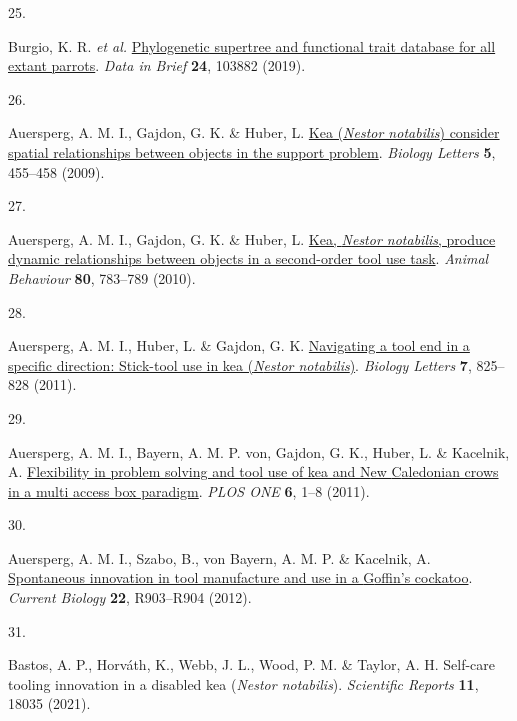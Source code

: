 \documentclass[
  man,floatsintext]{apa6}
\newlength{\cslhangindent}
\newlength{\csllabelwidth}
\newlength{\cslentryspacingunit} %
\newenvironment{CSLReferences}[2] %
 {%
  \setlength{\parindent}{0pt}
  \ifodd #1
  \let\oldpar\par
  \def\par{\hangindent=\cslhangindent\oldpar}
  \fi
  \setlength{\parskip}{#2\cslentryspacingunit}
 }%
 {}
\newcommand{\CSLLeftMargin}[1]{\parbox[t]{\csllabelwidth}{#1}}
\newcommand{\CSLRightInline}[1]{\parbox[t]{\linewidth - \csllabelwidth}{#1}\break}
\begin{document}
\begin{CSLReferences}{0}{0}
\leavevmode{}%
\CSLLeftMargin{25. }%
\CSLRightInline{Burgio, K. R. \emph{et al.} \href{https://doi.org/10.1016/j.dib.2019.103882}{Phylogenetic supertree and functional trait database for all extant parrots}. \emph{Data in Brief} \textbf{24}, 103882 (2019).}

\leavevmode{}%
\CSLLeftMargin{26. }%
\CSLRightInline{Auersperg, A. M. I., Gajdon, G. K. \& Huber, L. \href{https://doi.org/10.1098/rsbl.2009.0114}{Kea (\emph{{N}estor notabilis}) consider spatial relationships between objects in the support problem}. \emph{Biology Letters} \textbf{5}, 455--458 (2009).}

\leavevmode{}%
\CSLLeftMargin{27. }%
\CSLRightInline{Auersperg, A. M. I., Gajdon, G. K. \& Huber, L. \href{https://doi.org/10.1016/j.anbehav.2010.08.007}{Kea, \emph{{N}estor notabilis}, produce dynamic relationships between objects in a second-order tool use task}. \emph{Animal Behaviour} \textbf{80}, 783--789 (2010).}

\leavevmode{}%
\CSLLeftMargin{28. }%
\CSLRightInline{Auersperg, A. M. I., Huber, L. \& Gajdon, G. K. \href{https://doi.org/10.1098/rsbl.2011.0388}{Navigating a tool end in a specific direction: Stick-tool use in kea (\emph{{N}estor notabilis})}. \emph{Biology Letters} \textbf{7}, 825--828 (2011).}

\leavevmode{}%
\CSLLeftMargin{29. }%
\CSLRightInline{Auersperg, A. M. I., Bayern, A. M. P. von, Gajdon, G. K., Huber, L. \& Kacelnik, A. \href{https://doi.org/10.1371/journal.pone.0020231}{Flexibility in problem solving and tool use of kea and {N}ew {C}aledonian crows in a multi access box paradigm}. \emph{PLOS ONE} \textbf{6}, 1--8 (2011).}

\leavevmode{}%
\CSLLeftMargin{30. }%
\CSLRightInline{Auersperg, A. M. I., Szabo, B., von Bayern, A. M. P. \& Kacelnik, A. \href{https://doi.org/10.1016/j.cub.2012.09.002}{Spontaneous innovation in tool manufacture and use in a {G}offin's cockatoo}. \emph{Current Biology} \textbf{22}, R903--R904 (2012).}

\leavevmode{}%
\CSLLeftMargin{31. }%
\CSLRightInline{Bastos, A. P., Horváth, K., Webb, J. L., Wood, P. M. \& Taylor, A. H. Self-care tooling innovation in a disabled kea (\emph{{N}estor notabilis}). \emph{Scientific Reports} \textbf{11}, 18035 (2021).}


\end{CSLReferences}
\end{document}
